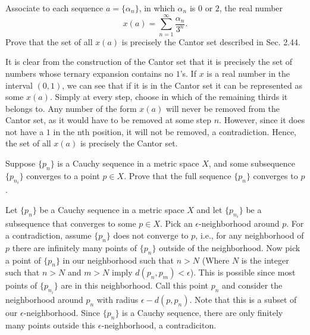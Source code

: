 \setcounter{problem}{18}
\begin{problem}
  Associate to each sequence $a = \{\alpha_n\}$, in which $\alpha_n$ is $0$ or $2$, the real number
  \[x(a) = \sum_{n = 1}^{\infty} \frac{\alpha_n}{3^n}.\]
  Prove that the set of all $x(a)$ is precisely the Cantor set described in Sec. 2.44.
\end{problem}

\begin{solution}
  It is clear from the construction of the Cantor set that it is precisely the set of numbers whose ternary expansion contains no $1$'s.
  If $x$ is a real number in the interval $(0, 1)$, we can see that if it is in the Cantor set it can be represented as some $x(a)$.
  Simply at every step, choose in which of the remaining thirds it belongs to.
  Any number of the form $x(a)$ will never be removed from the Cantor set, as it would have to be removed at some step $n$.
  However, since it does not have a $1$ in the nth position, it will not be removed, a contradiction.
  Hence, the set of all $x(a)$ is precisely the Cantor set.
\end{solution}

\begin{problem}
  Suppose $\{p_n\}$ is a Cauchy sequence in a metric space $X$, and some subsequence $\{p_{n_i}\}$ converges to a point $p \in X$.
  Prove that the full sequence $\{p_n\}$ converges to $p$.
\end{problem}

\begin{solution}
  Let $\{p_n\}$ be a Cauchy sequence in a metric space $X$ and let $\{p_{n_i}\}$ be a subsequence that converges to some $p \in X$.
  Pick an $\epsilon$-neighborhood around $p$.
  For a contradiction, assume $\{p_n\}$ does not converge to $p$, i.e., for any neighborhood of $p$ there are infinitely many points of $\{p_n\}$ outside of the neighborhood.
  Now pick a point of $\{p_{n}\}$ in our neighborhood such that $n > N$ (Where $N$ is the integer such that $n > N$ and $m > N$ imply $d(p_n, p_m) < \epsilon$).
  This is possible since most points of $\{p_{n_i}\}$ are in this neighborhood.
  Call this point $p_n$ and consider the neighborhood around $p_n$ with radius $\epsilon - d(p, p_n)$.
  Note that this is a subset of our $\epsilon$-neighborhood.
  Since $\{p_n\}$ is a Cauchy sequence, there are only finitely many points outside this $\epsilon$-neighborhood, a contradiciton.
\end{solution}

